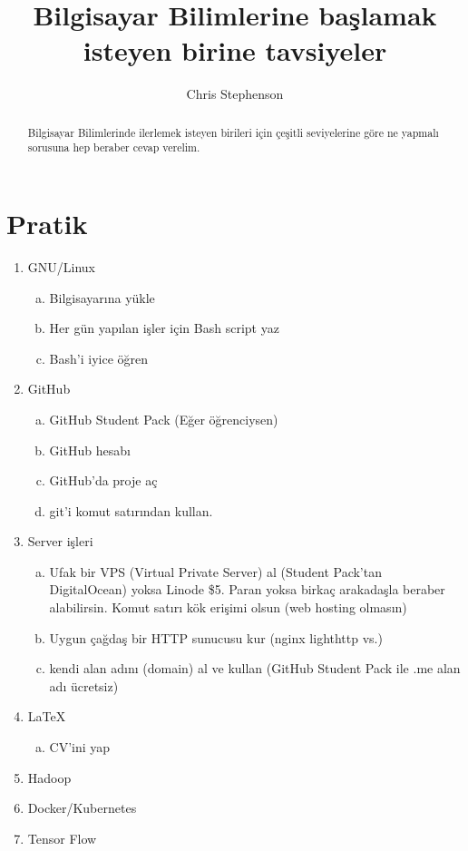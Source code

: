 \documentclass[a4paper,10pt]{article}
\title{Bilgisayar Bilimlerine başlamak isteyen birine tavsiyeler}
\author{Chris Stephenson}
\begin{document}
\maketitle

\begin{abstract}
Bilgisayar Bilimlerinde ilerlemek isteyen birileri için çeşitli seviyelerine göre ne yapmalı sorusuna hep beraber cevap verelim. 
\end{abstract}

\section*{Pratik}
\begin{enumerate}
  \item GNU/Linux
    \begin{enumerate}[(a)]
      \item Bilgisayarına yükle 
      \item Her gün yapılan işler için Bash script yaz
      \item Bash'i iyice öğren
    \end{enumerate}
  \item GitHub
    \begin{enumerate}[(a)]
      \item GitHub Student Pack (Eğer öğrenciysen)
      \item GitHub hesabı
      \item GitHub'da proje aç
      \item git'i komut satırından kullan.
    \end{enumerate}
  \item Server işleri
    \begin{enumerate}[(a)]
      \item Ufak bir VPS (Virtual Private Server) al (Student Pack'tan DigitalOcean) yoksa Linode \$5. Paran yoksa birkaç arakadaşla beraber alabilirsin. Komut satırı kök erişimi olsun (web hosting olmasın)
      \item Uygun çağdaş bir HTTP sunucusu kur (nginx lighthttp vs.)
      \item kendi alan adını (domain) al ve kullan (GitHub Student Pack ile .me alan adı ücretsiz)
    \end{enumerate}
  \item \LaTeX 
    \begin{enumerate}[(a)]
      \item CV'ini yap
    \end{enumerate}
   \item Hadoop
   \item Docker/Kubernetes
   \item Tensor Flow
    
\end{enumerate}
\end{document}
